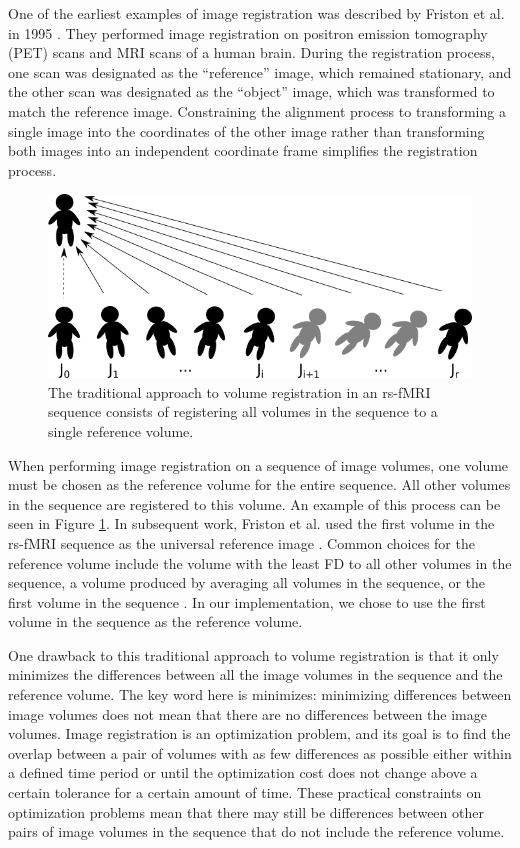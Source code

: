 One of the earliest examples of image registration was described by Friston et al. in 1995 \cite{Friston1995}. They performed image registration on positron emission tomography (PET) scans and MRI scans of a human brain. During the registration process, one scan was designated as the ``reference'' image, which remained stationary, and the other scan was designated as the ``object'' image, which was transformed to match the reference image. Constraining the alignment process to transforming a single image into the coordinates of the other image rather than transforming both images into an independent coordinate frame simplifies the registration process.

\begin{figure}
\centering
\includegraphics[width=.7\textwidth]{3/traditional-registration.png}
\caption{The traditional approach to volume registration in an rs-fMRI sequence consists of registering all volumes in the sequence to a single reference volume.}
\label{fig:ch4:traditional-reg}
\end{figure}

When performing image registration on a sequence of image volumes, one volume must be chosen as the reference volume for the entire sequence. All other volumes in the sequence are registered to this volume. An example of this process can be seen in Figure \ref{fig:ch4:traditional-reg}. In subsequent work, Friston et al. used the first volume in the rs-fMRI sequence as the universal reference image \cite{Friston1996}. Common choices for the reference volume include the volume with the least FD to all other volumes in the sequence, a volume produced by averaging all volumes in the sequence, or the first volume in the sequence \cite{Friston1996} \cite{Liao2005}. In our implementation, we chose to use the first volume in the sequence as the reference volume.

One drawback to this traditional approach to volume registration is that it only minimizes the differences between all the image volumes in the sequence and the reference volume. The key word here is minimizes: minimizing differences between image volumes does not mean that there are no differences between the image volumes. Image registration is an optimization problem, and its goal is to find the overlap between a pair of volumes with as few differences as possible either within a defined time period or until the optimization cost does not change above a certain tolerance for a certain amount of time. These practical constraints on optimization problems mean that there may still be differences between other pairs of image volumes in the sequence that do not include the reference volume. 

